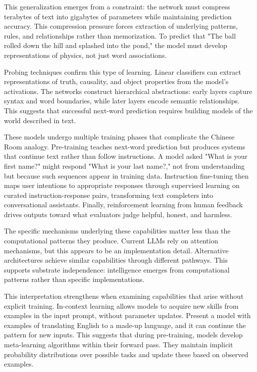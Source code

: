 This generalization emerges from a constraint: the network must compress terabytes of text into gigabytes of parameters while maintaining prediction accuracy. This compression pressure forces extraction of underlying patterns, rules, and relationships rather than memorization. To predict that "The ball rolled down the hill and splashed into the pond," the model must develop representations of physics, not just word associations.

Probing techniques confirm this type of learning. Linear classifiers can extract representations of truth, causality, and object properties from the model's activations. The networks construct hierarchical abstractions: early layers capture syntax and word boundaries, while later layers encode semantic relationships. This suggests that successful next-word prediction requires building models of the world described in text.

These models undergo multiple training phases that complicate the Chinese Room analogy. Pre-training teaches next-word prediction but produces systems that continue text rather than follow instructions. A model asked "What is your first name?" might respond "What is your last name?," not from understanding but because such sequences appear in training data. Instruction fine-tuning then maps user intentions to appropriate responses through supervised learning on curated instruction-response pairs, transforming text completers into conversational assistants. Finally, reinforcement learning from human feedback drives outputs toward what evaluators judge helpful, honest, and harmless.

The specific mechanisms underlying these capabilities matter less than the computational patterns they produce. Current LLMs rely on attention mechanisms, but this appears to be an implementation detail. Alternative architectures achieve similar capabilities through different pathways. This supports substrate independence: intelligence emerges from computational patterns rather than specific implementations.

This interpretation strengthens when examining capabilities that arise without explicit training. In-context learning allows models to acquire new skills from examples in the input prompt, without parameter updates. Present a model with examples of translating English to a made-up language, and it can continue the pattern for new inputs. This suggests that during pre-training, models develop meta-learning algorithms within their forward pass. They maintain implicit probability distributions over possible tasks and update these based on observed examples.

